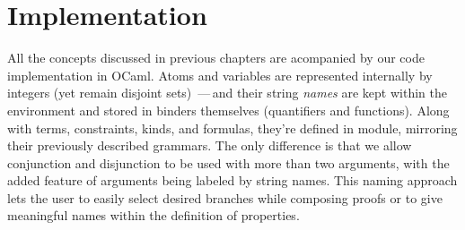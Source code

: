 \documentclass[english, mgr]{iithesis}
\newcommand{\lstt}[1]{\text{{\lstinline[columns=fixed,mathescape]|#1|}}}
\renewcommand{\it}[1]{\textit{#1}}
\newcommand{\fix}[3]{\ensuremath{\text{fix }#1(#2)\ofkind#3=}}\newcommand{\myatop}[2]{\ensuremath{\genfrac{}{}{0pt}{}{#1\hfill}{#2\hfill}}}
\newcommand{\mdash}{\,---\,}
\def\-{{\mdash}}
\begin{document}

\chapter{Implementation}
All the concepts discussed in previous chapters are acompanied by our code implementation in OCaml.
Atoms and variables are represented internally by integers (yet remain disjoint sets)
\-and their string \it{names} are kept within the environment and
stored in binders themselves (quantifiers and functions).
Along with terms, constraints, kinds, and formulas, they're defined in \lstt{Types} module,
mirroring their previously described grammars.
The only difference is that we allow conjunction and disjunction to be used with
more than two arguments, with the added feature of arguments being labeled by string names.
This naming approach lets the user to easily select desired branches while composing proofs
or to give meaningful names within the definition of properties.
\end{document}
